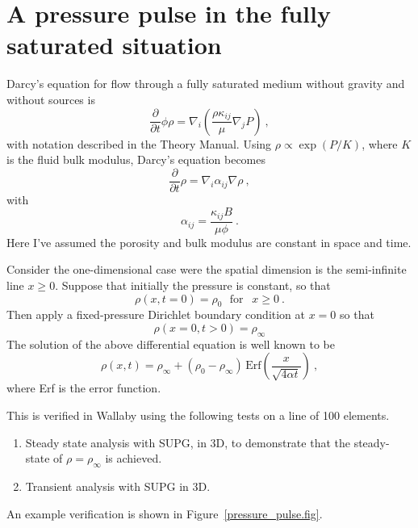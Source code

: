 \documentclass[]{scrreprt}
\begin{document}
\chapter{A pressure pulse in the fully saturated situation}

Darcy's equation for flow through a fully saturated medium without
gravity and without sources is 
\begin{equation}
\frac{\partial}{\partial t}\phi\rho = \nabla_{i}\left(\frac{\rho
  \kappa_{ij}}{\mu} \nabla_{j}P \right) \ ,
\end{equation}
with notation described in the Theory Manual.  Using $\rho \propto
\exp(P/K)$, where $K$ is the fluid bulk modulus, Darcy's equation
becomes
\begin{equation}
\frac{\partial}{\partial t}\rho = \nabla_{i}\alpha_{ij}\nabla\rho \ ,
\end{equation}
with 
\begin{equation}
\alpha_{ij} = \frac{\kappa_{ij}B}{\mu\phi} \ .
\end{equation}
Here I've assumed the porosity and bulk modulus are constant in space
and time.

Consider the one-dimensional case were the spatial dimension is the
semi-infinite line $x\geq 0$.  Suppose that initially the pressure is
constant, so that
\begin{equation}
\rho(x, t=0) = \rho_{0} \ \ \ \mbox{for }\ \ x\geq 0 \ .
\end{equation}
Then apply a fixed-pressure Dirichlet boundary condition at $x=0$ so
that
\begin{equation}
\rho(x=0, t>0) = \rho_{\infty}
\end{equation}
The solution of the above differential equation is well known to be
\begin{equation}
\rho(x, t) = \rho_{\infty} + (\rho_{0} -
\rho_{\infty})\,\mbox{Erf}\left( \frac{x}{\sqrt{4\alpha t}} \right) \ ,
\label{eqn.exact.pp}
\end{equation}
where Erf is the error function.

This is verified in Wallaby using the following tests on a line of
100 elements.
\begin{enumerate}
\item Steady state analysis with SUPG, in 3D, to demonstrate that the
  steady-state of $\rho = \rho_{\infty}$ is achieved.
\item Transient analysis with SUPG in 3D.
\end{enumerate}
An example verification is shown in Figure~\ref{pressure_pulse.fig}.
\end{document}

